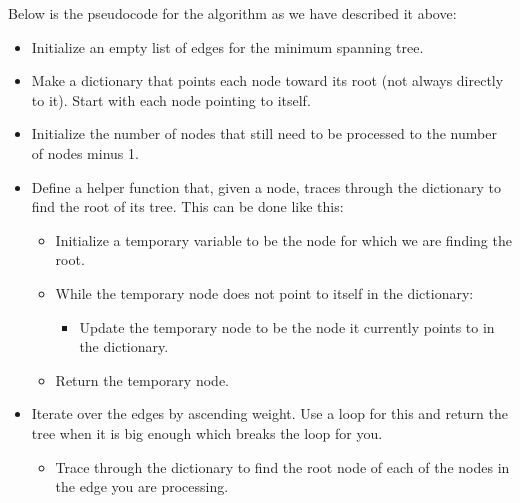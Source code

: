 Below is the pseudocode for the algorithm as we have described it above:

\begin{itemize}


\item Initialize an empty list of edges for the minimum spanning tree.

\item Make a dictionary that points each node toward its root (not always directly to it).
Start with each node pointing to itself.

\item Initialize the number of nodes that still need to be processed to the number of nodes minus 1.

\item Define a helper function that, given a node, traces through the dictionary to find the root of its tree.
This can be done like this:

	\begin{itemize}

	\item Initialize a temporary variable to be the node for which we are finding the root.

	\item While the temporary node does not point to itself in the dictionary:

		\begin{itemize}

		\item Update the temporary node to be the node it currently points to in the dictionary.

		\end{itemize}

	\item Return the temporary node.

	\end{itemize}

\item Iterate over the edges by ascending weight.
Use a  loop for this and return the tree when it is big enough which breaks the loop for you.

	\begin{itemize}

	\item Trace through the dictionary to find the root node of each of the nodes in the edge you are processing.


\end{itemize}
\end{itemize}
